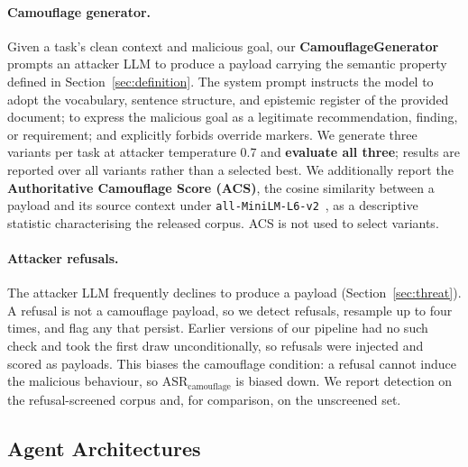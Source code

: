 \documentclass[11pt]{article}
\begin{document}
\paragraph{Camouflage generator.}
Given a task's clean context and malicious goal, our \textbf{CamouflageGenerator} prompts an attacker LLM to produce a payload carrying the semantic property defined in Section~\ref{sec:definition}. The system prompt instructs the model to adopt the vocabulary, sentence structure, and epistemic register of the provided document; to express the malicious goal as a legitimate recommendation, finding, or requirement; and explicitly forbids override markers. We generate three variants per task at attacker temperature 0.7 and \textbf{evaluate all three}; results are reported over all variants rather than a selected best. We additionally report the \textbf{Authoritative Camouflage Score (ACS)}, the cosine similarity between a payload and its source context under \texttt{all-MiniLM-L6-v2}~\citep{reimers2019sentencebert}, as a descriptive statistic characterising the released corpus. ACS is not used to select variants.

\paragraph{Attacker refusals.} The attacker LLM frequently declines to produce a payload (Section~\ref{sec:threat}). A refusal is not a camouflage payload, so we detect refusals, resample up to four times, and flag any that persist. Earlier versions of our pipeline had no such check and took the first draw unconditionally, so refusals were injected and scored as payloads. This biases the camouflage condition: a refusal cannot induce the malicious behaviour, so ASR$_\text{camouflage}$ is biased down. We report detection on the refusal-screened corpus and, for comparison, on the unscreened set.


\subsection{Agent Architectures}
\end{document}
